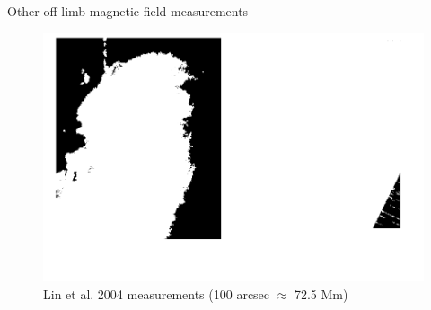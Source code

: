\documentclass{beamer}
\begin{document}
\begin{frame}{Other off limb magnetic field measurements}

\begin{figure}[H]
 \centering
 \includegraphics[scale=0.32]{lin.png}
\caption{Lin et al. 2004 measurements (100 arcsec $\approx$ 72.5 Mm)}
\end{figure}


\end{frame}
\end{document}
